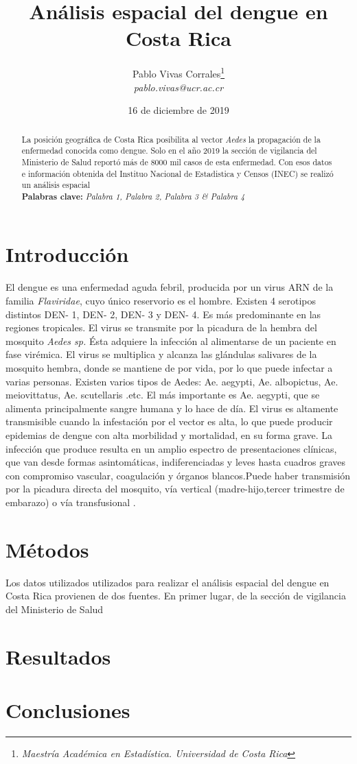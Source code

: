 \documentclass[12pt,a4paper]{article}
\author{Pablo Vivas Corrales\footnote{\textit{Maestría Académica en Estadística. Universidad de Costa Rica}}\\\textit{pablo.vivas@ucr.ac.cr}}
\title{Análisis espacial del dengue en Costa Rica}
\date{16 de diciembre de 2019}
\begin{document}
\maketitle
\begin{abstract}
\noindent
La posición geográfica de Costa Rica posibilita al vector \textit{Aedes} la propagación de la enfermedad conocida como dengue. Solo en el año 2019 la sección de vigilancia del Ministerio de Salud reportó más de 8000 mil casos de esta enfermedad. Con esos datos e información obtenida del Instituo Nacional de Estadistica y Censos (INEC) se realizó un análisis espacial \\
\textbf{Palabras clave:} \textit{Palabra 1, Palabra 2, Palabra 3 \& Palabra 4} 
\end{abstract}
\section{Introducción}
El dengue es una enfermedad aguda febril, producida por un virus ARN de la familia
\textit{Flaviridae}, cuyo único reservorio es el hombre. Existen 4 serotipos distintos DEN- 1, DEN- 2, DEN- 3 y DEN- 4. Es más predominante en las regiones tropicales. El virus se transmite por la picadura de la hembra del mosquito \textit{Aedes sp.} Ésta adquiere la infección al alimentarse de un paciente en fase virémica. El virus se multiplica y alcanza las glándulas salivares de la mosquito hembra, donde se mantiene de por vida, por lo que puede infectar a varias personas. Existen varios tipos de Aedes: Ae. aegypti, Ae. albopictus, Ae. meiovittatus, Ae. scutellaris .etc. El más importante es Ae. aegypti, que se alimenta principalmente sangre humana y lo hace de día. El virus es altamente transmisible cuando la infestación por el vector es alta, lo que puede producir epidemias de dengue con alta morbilidad y mortalidad, en su forma grave. La infección que produce resulta en un amplio espectro de presentaciones clínicas, que van desde formas asintomáticas, indiferenciadas y leves hasta cuadros graves con compromiso vascular, coagulación y órganos blancos.Puede haber transmisión por la picadura directa del mosquito, vía vertical (madre-hijo,tercer trimestre de embarazo) o vía transfusional \cite{CajaCostarricensedelSeguroSocial2013}.
\section{Métodos}
Los datos utilizados utilizados para realizar el análisis espacial del dengue en Costa Rica provienen de dos fuentes. En primer lugar, de la sección de vigilancia del Ministerio de Salud
\section{Resultados}
\section{Conclusiones}




\end{document}
